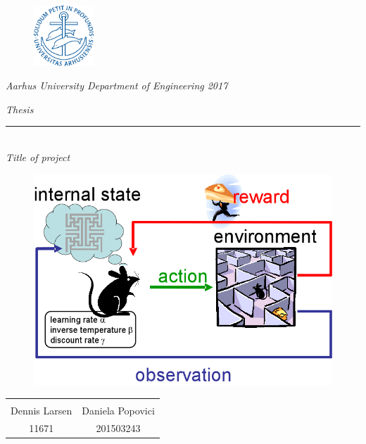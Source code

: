 \thispagestyle{empty}

\begin{figure}[H]
	\raggedleft
	\includegraphics[width=0.2\textwidth]{Figures/Aarhus_University_logo.png}
\end{figure}

\begin{center}
\textsl{Aarhus University Department of Engineering 2017 } \\ \vspace{0.5cm}

\phantom{hul}

\textsl{\HUGE Thesis } \\ \vspace{0cm}
\rule{15cm}{0.5mm}  \\ \vspace{0.5cm}
\textsl{\LARGE  Title of project} \\ \vspace{0.5cm}

\vspace{0.5cm}

\begin{figure}[H]
\centering
\includegraphics[width=1\textwidth]{Figures/Frontpage.png}
\label{fig:frontpage}
\end{figure}


\vspace{0.7cm}

\begin{table}[H]
	\centering
		\begin{tabular}{c c}
			\underline{\phantom{mmmmmmmmmmmmmmmm}} & \underline{\phantom{mmmmmmmmmmmmmmmm}}  
			\\
			 Dennis Larsen		& Daniela Popovici 	
			 \\
			 11671				& 201503243																	
		\end{tabular}
\end{table}
\end{center}

